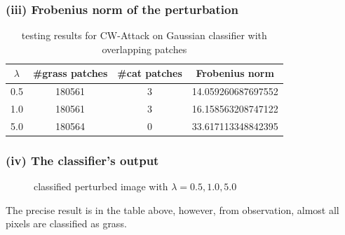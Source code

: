 \documentclass[11pt]{article}
\begin{document}
\subsubsection*{(iii) Frobenius norm of the perturbation}
\begin{table}[h]
	\centering
	\begin{tabular}{c|c|c|c}
		
		$\lambda$ & \#grass patches & \#cat patches & Frobenius norm\\ 
		\hline\hline
		0.5 & 180561 & 3 & 14.059260687697552 \\  
		1.0 & 180561 & 3 & 16.158563208747122 \\
		5.0 & 180564 & 0 & 33.617113348842395
	\end{tabular}
	\caption{testing results for CW-Attack on Gaussian classifier with overlapping patches}
\end{table}
\subsubsection*{(iv) The classifier’s output}
\begin{figure}[h]
	\centering
	\caption{classified perturbed image with $\lambda = 0.5, 1.0, 5.0$}
\end{figure}
The precise result is in the table above, however, from observation, almost all pixels are classified as grass.
\end{document}
